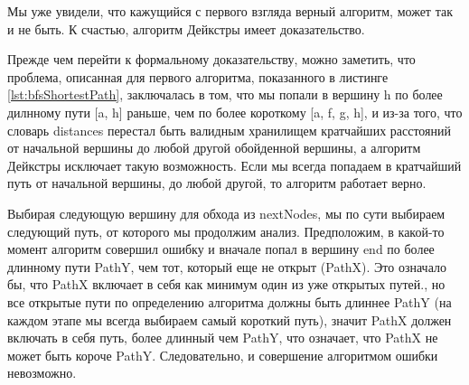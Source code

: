 \documentclass[../article.tex]{subfiles}
\begin{document}
Мы уже увидели, что кажущийся с первого взгляда верный алгоритм, может так и не быть. К счастью, алгоритм Дейкстры имеет доказательство.

Прежде чем перейти к формальному доказательству, можно заметить, что проблема, описанная для первого алгоритма, показанного в листинге \ref{lst:bfsShortestPath}, заключалась в том, что мы попали в вершину h по более дилнному пути [a, h] раньше, чем по более короткому [a, f, g, h], и из-за того, что словарь distances перестал быть валидным хранилищем кратчайших расстояний от начальной вершины до любой другой обойденной вершины, а алгоритм Дейкстры исключает такую возможность. Если мы всегда попадаем в кратчайший путь от начальной вершины, до любой другой, то алгоритм работает верно.

Выбирая следующую вершину для обхода из nextNodes, мы по сути выбираем следующий путь, от которого мы продолжим анализ. Предположим, в какой-то момент алгоритм совершил ошибку и вначале попал в вершину end по более длинному пути PathY, чем тот, который еще не открыт (PathX). Это означало бы, что PathX включает в себя как минимум один из уже открытых путей., но все открытые пути по определению алгоритма должны быть длиннее PathY (на каждом этапе мы всегда выбираем самый короткий путь), значит PathX должен включать в себя путь, более длинный чем PathY, что означает, что PathX не может быть короче PathY. Следовательно, и совершение алгоритмом ошибки невозможно.
\end{document}
